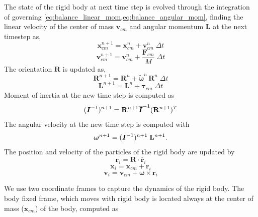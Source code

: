 \documentclass[preprint,12pt]{elsarticle}
\newcommand{\teng}[1]{\ensuremath{\boldsymbol{#1}}}
\newcommand{\ten}[1]{\ensuremath{\mathbf{#1}}}
\begin{document}
The state of the rigid body at next time step is evolved through the
integration of governing \cref{eq:balance_linear_mom,eq:balance_angular_mom},
finding the linear velocity of the center of mass $\ten{v}_{cm}$ and angular
momentum $\ten{L}$ at the next timestep as,
\begin{equation}
  \label{eq:lin_pos_cm_update}
  \ten{x}_{cm}^{n+1} = \ten{x}_{cm}^{n} + \ten{v}_{cm}^{n} \; \Delta t
\end{equation}
\begin{equation}
  \label{eq:lin_vel_cm_update}
  \ten{v}_{cm}^{n+1} = \ten{v}_{cm}^{n} + \frac{\ten{F}_{cm}}{M} \; \Delta t
\end{equation}
 The orientation $\ten{R}$ is updated as,
\begin{equation}
  \label{eq:rotation_update}
  \ten{R}^{n+1} = \ten{R}^{n} + \tilde{\teng{\omega}}^{n} \, \ten{R}^{n} \; \Delta t
\end{equation}
\begin{equation}
  \label{eq:ang_mom_update}
  \ten{L}^{n+1} = \ten{L}^{n} + \teng{\tau}_{cm} \; \Delta t
\end{equation}
Moment of inertia at the new time step is computed as
\begin{equation}
  \label{eq:moi_update}
  (\textit{\teng{I}}^{-1})^{n+1} = \ten{R}^{n+1} \textit{\teng{\overline{I}}}^{-1} (\ten{R}^{n+1})^T
\end{equation}
The angular velocity at the new time step is computed with
\begin{equation}
  \label{eq:ang_velocity_update}
  \teng{\omega}^{n+1} = (\textit{\teng{I}}^{-1})^{n+1} \; \ten{L}^{n+1}.
\end{equation}
The position and velocity of the particles of the rigid body are updated by
\begin{equation}
  \label{eq:rb_particle_pos_update}
  \ten{r}_i = \ten{R} \cdot \overline{\ten{r}}_{i}
\end{equation}
\begin{equation}
  \label{eq:rb_particle_pos_update}
  \ten{x}_i = \ten{x}_{cm} + \ten{r}_{i}
\end{equation}
\begin{equation}
  \label{eq:rb_particle_vel_update}
  \ten{v}_i = \ten{v}_{cm} + \teng{\omega} \times \ten{r}_{i}
\end{equation}


We use two coordinate frames to capture the dynamics of the rigid body. The
body fixed frame, which moves with rigid body is located always at the center
of mass ($\ten{x}_{cm}$) of the body, computed as
\end{document}
